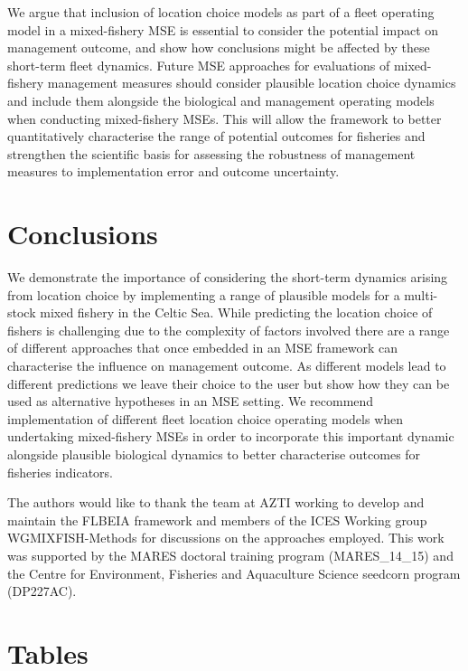 \documentclass[12pt, halfline, a4paper]{ouparticle}
\begin{document}
We argue that inclusion of location choice models as part of a fleet operating
model in a mixed-fishery MSE is essential to consider the potential impact
on management outcome, and show how conclusions might be affected by these
short-term fleet dynamics. Future MSE approaches for evaluations of
mixed-fishery management measures should consider plausible location choice
dynamics and include them alongside the biological and management operating
models when conducting mixed-fishery MSEs. This will allow the framework to
better quantitatively characterise the range of potential outcomes for
fisheries and strengthen the scientific basis for assessing the robustness of
management measures to implementation error and outcome uncertainty. 

\section{Conclusions} \label{con}

We demonstrate the importance of considering the short-term dynamics arising
from location choice by implementing a range of plausible models for a
multi-stock mixed fishery in the Celtic Sea. While predicting the location
choice of fishers is challenging due to the complexity of factors involved
there are a range of different approaches that once embedded in an MSE framework can characterise the influence
on management outcome. As different models lead to different predictions we
leave their choice to the user but show how they can be used as alternative hypotheses in an MSE setting. We
recommend implementation of different fleet location choice operating models
when undertaking mixed-fishery MSEs in order to incorporate this important
dynamic alongside plausible biological dynamics to better characterise outcomes
for fisheries indicators.

\begin{notes}[Acknowledgements] The authors would like to thank the team at AZTI working to develop and
maintain the FLBEIA framework and members of the ICES Working group
WGMIXFISH-Methods for discussions on the approaches employed. This work was supported by the MARES doctoral training program
(MARES\_14\_15) and the Centre for Environment, Fisheries and Aquaculture Science seedcorn program (DP227AC). 
\end{notes}




\clearpage

\section{Tables}
\end{document}
